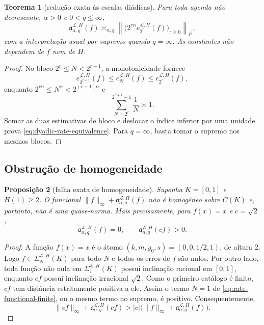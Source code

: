 \documentclass[11pt,a4paper]{article}
\newtheorem{theorem}{Teorema}[section]
\newtheorem{proposition}[theorem]{Proposição}
\theoremstyle{definition}
\theoremstyle{remark}
\newcommand{\Library}{\mathcal{L}}
\begin{document}
\begin{theorem}[redução exata às escalas diádicas]
\label{thm:dyadic-rate-equivalence}
Para toda agenda não decrescente, $\alpha>0$ e $0<q\le\infty$,
\begin{equation}
 \mathfrak a_{\alpha,q}^{\Library,H}(f)
 \asymp_{\alpha,q}
 \left\|\bigl(2^{r\alpha}
 e_{2^r}^{\Library,H}(f)\bigr)_{r\ge0}\right\|_{\ell^q},
 \label{eq:dyadic-rate-equivalence}
\end{equation}
com a interpretação usual por supremo quando $q=\infty$. As constantes não
dependem de $f$ nem de $H$.
\end{theorem}

\begin{proof}
No bloco $2^r\le N<2^{r+1}$, a monotonicidade fornece
\[
 e_{2^{r+1}}^{\Library,H}(f)
 \le e_N^{\Library,H}(f)
 \le e_{2^r}^{\Library,H}(f),
\]
enquanto $2^{r\alpha}\le N^\alpha<2^{(r+1)\alpha}$ e
\[
 \sum_{N=2^r}^{2^{r+1}-1}\frac1N\asymp1.
\]
Somar as duas estimativas de bloco e deslocar o índice inferior por uma
unidade prova \eqref{eq:dyadic-rate-equivalence}. Para $q=\infty$, basta
tomar o supremo nos mesmos blocos.
\end{proof}

\subsection{Obstrução de homogeneidade}

\begin{proposition}[falha exata de homogeneidade]
\label{prop:nonhomogeneous-functional}
Suponha $K=[0,1]$ e $H(1)\ge2$. O funcional
$\|f\|_\infty+\mathfrak a_{\alpha,q}^{\Library,H}(f)$ não é homogêneo sobre
$C(K)$ e, portanto, não é uma quase-norma. Mais precisamente, para
$f(x)=x$ e $c=\sqrt2$,
\begin{equation}
 \mathfrak a_{\alpha,q}^{\Library,H}(f)=0,
 \qquad
 \mathfrak a_{\alpha,q}^{\Library,H}(cf)>0.
 \label{eq:nonhomogeneous-certificate}
\end{equation}
\end{proposition}

\begin{proof}
A função $f(x)=x$ é o átomo $(k,m,y_0,s)=(0,0,1/2,1)$, de altura $2$.
Logo $f\in\Sigma_N^{\Library,H}(K)$ para todo $N$ e todos os erros de
$f$ são nulos. Por outro lado, toda função não nula em
$\Sigma_1^{\Library,H}(K)$ possui inclinação racional em $[0,1]$, enquanto
$cf$ possui inclinação irracional $\sqrt2$. Como o primeiro catálogo é
finito, $cf$ tem distância estritamente positiva a ele. Assim o termo
$N=1$ de \eqref{eq:rate-functional-finite}, ou o mesmo termo no supremo,
é positivo. Consequentemente,
\[
 \|cf\|_\infty+\mathfrak a_{\alpha,q}^{\Library,H}(cf)
 >|c|\bigl(\|f\|_\infty+
 \mathfrak a_{\alpha,q}^{\Library,H}(f)\bigr).
\]
\end{proof}
\end{document}
